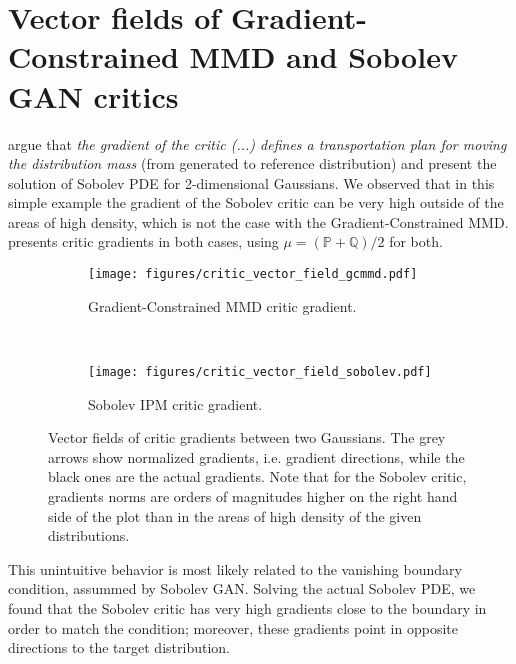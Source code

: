 \documentclass{article}
\newcommand{\PP}{\mathbb P}
\newcommand{\QQ}{\mathbb Q}
\let\citet\textcite
\begin{document}
\section{Vector fields of Gradient-Constrained MMD and Sobolev GAN critics} \label{appendix:critic-vector-fields}
\citet{sobolev-gan} argue that \emph{the gradient of the critic (...) defines a transportation plan
for moving the distribution mass} (from generated to reference distribution) and present
the solution of Sobolev PDE for 2-dimensional Gaussians. We observed that in this simple example
the gradient of the Sobolev critic can be very high outside of the areas of high density,
which is not the case with the Gradient-Constrained MMD.
presents critic gradients in both cases,
using $\mu = (\PP + \QQ) / 2$ for both.
\begin{figure}[ht]
\centering
    \begin{subfigure}[t]{.48\linewidth}
        \centering
        \texttt{[image: figures/critic\_vector\_field\_gcmmd.pdf]}
        \caption{Gradient-Constrained MMD critic gradient.}
    \end{subfigure}
    ~
    \begin{subfigure}[t]{.48\linewidth}
        \centering
        \texttt{[image: figures/critic\_vector\_field\_sobolev.pdf]}
        \caption{Sobolev IPM critic gradient.}
    \end{subfigure}
    \caption{Vector fields of critic gradients between two Gaussians. The grey arrows show
normalized gradients, i.e. gradient directions, while the black ones are the actual gradients.
Note that for the Sobolev critic, gradients norms are orders of magnitudes higher on the right hand side
of the plot than in the areas of high density of the given distributions.}
    \label{fig:critic_vector_fields}
\end{figure}

This unintuitive behavior is most likely
related to the vanishing boundary condition, assummed by Sobolev GAN. Solving the actual Sobolev PDE,
we found that the Sobolev critic has very high gradients close to the boundary in order to match
the condition; moreover, these gradients point in opposite directions to the target distribution.
\end{document}

